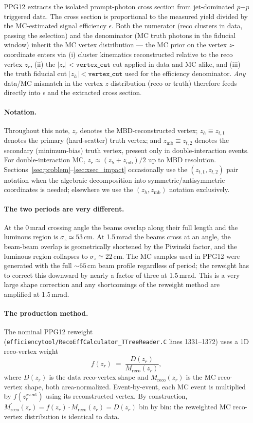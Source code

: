 \documentclass[11pt,a4paper]{article}
\begin{document}
PPG12 extracts the isolated prompt-photon cross section from jet-dominated
$p$+$p$ triggered data. The cross section is proportional to the measured
yield divided by the MC-estimated signal efficiency $\epsilon$. Both the
numerator (reco clusters in data, passing the selection) and the
denominator (MC truth photons in the fiducial window) inherit the MC
vertex distribution --- the MC prior on the vertex $z$-coordinate enters
via (i) cluster kinematics reconstructed relative to the reco vertex
$z_r$, (ii) the $|z_r|<\mathtt{vertex\_cut}$ cut applied in data and MC
alike, and (iii) the truth fiducial cut $|z_h|<\mathtt{vertex\_cut}$
used for the efficiency denominator. \emph{Any} data/MC mismatch in the
vertex $z$ distribution (reco or truth) therefore feeds directly into
$\epsilon$ and the extracted cross section.

\paragraph{Notation.}
Throughout this note, $z_r$ denotes the MBD-reconstructed vertex;
$z_h \equiv z_{t,1}$ denotes the primary (hard-scatter) truth vertex;
and $z_\mathrm{mb} \equiv z_{t,2}$ denotes the secondary (minimum-bias)
truth vertex, present only in double-interaction events.
For double-interaction MC, $z_r \approx (z_h + z_\mathrm{mb})/2$ up to
MBD resolution.
Sections~\ref{sec:problem}--\ref{sec:xsec_impact} occasionally use the
$(z_{t,1}, z_{t,2})$ pair notation when the algebraic decomposition into
symmetric/antisymmetric coordinates is needed; elsewhere we use the
$(z_h, z_\mathrm{mb})$ notation exclusively.

\paragraph{The two periods are very different.}
At the 0\,mrad crossing angle the beams overlap along their full length
and the luminous region is $\sigma_z \simeq 53$\,cm. At 1.5\,mrad the
beams cross at an angle, the beam-beam overlap is geometrically shortened
by the Piwinski factor, and the luminous region collapses to
$\sigma_z \simeq 22$\,cm. The MC samples used in PPG12 were generated
with the full $\sim\!65$\,cm beam profile regardless of period; the
reweight has to correct this downward by nearly a factor of three at
1.5\,mrad. This is a very large shape correction and any shortcomings of
the reweight method are amplified at 1.5\,mrad.

\paragraph{The production method.}
The nominal PPG12 reweight
(\texttt{efficiencytool/RecoEffCalculator\_TTreeReader.C} lines
1331--1372) uses a 1D reco-vertex weight
\[
f(z_r) \;=\; \frac{D(z_r)}{M_\mathrm{reco}(z_r)},
\]
where $D(z_r)$ is the data reco-vertex shape and $M_\mathrm{reco}(z_r)$
is the MC reco-vertex shape, both area-normalized. Event-by-event, each
MC event is multiplied by $f(z_r^\mathrm{event})$ using its reconstructed
vertex. By construction,
$M^\prime_\mathrm{reco}(z_r) = f(z_r)\cdot M_\mathrm{reco}(z_r) = D(z_r)$
bin by bin: the reweighted MC reco-vertex distribution is identical to
data.
\end{document}
